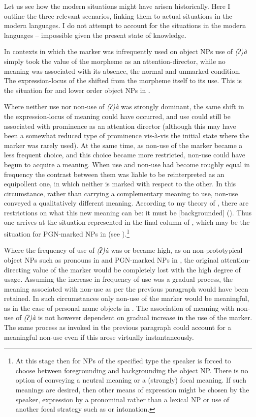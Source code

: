 \documentclass[output=paper]{LSP/langsci}
\begin{document}
Let us see how the modern situations might have arisen historically. 
Here I outline the three relevant scenarios, linking them to actual situations in the modern languages. I do not attempt to account for the situations in the modern languages – impossible given the present state of knowledge.

In contexts in which the marker was infrequently used on object NPs use of \textit{(ʔ)à} simply took the value of the morpheme as an attention-director, while no meaning was associated with its absence, the normal and unmarked condition. 
The expression-locus of the  shifted from the morpheme itself to its use. This is the situation for  and lower order  object NPs in .

Where neither use nor non-use of \textit{(ʔ)à} was strongly dominant, the same shift in the expression-locus of meaning could have occurred, and use could still be associated with prominence as an attention director (although this may have been a somewhat reduced type of prominence vis-à-vis the initial state where the marker was rarely used). At the same time, as non-use of the marker became a less frequent choice, and this choice became more restricted, non-use could have begun to acquire a meaning. When use and non-use had become roughly equal in frequency the contrast between them was liable to be reinterpreted as an equipollent one, in which neither is marked with respect to the other. In this circumstance, rather than carrying a complementary meaning to use, non-use conveyed a qualitatively different meaning. According to my theory of , there are restrictions on what this new meaning can be: it must be [backgrounded] (\citealt{McGregor2013Optionality}). Thus one arrives at the situation represented in the final column of , which may be the situation for PGN-marked NPs in  (see ).\footnote{At this stage then for NPs of the specified type the speaker is forced to choose between foregrounding and backgrounding the object NP. There is no option of conveying a neutral meaning or a (strongly) focal meaning. If such meanings are desired, then other means of expression might be chosen by the speaker, \eg expression by a pronominal rather than a lexical NP or use of another focal strategy such as  or intonation.}

Where the frequency of use of \textit{(ʔ)à} was or became high, as on non-prototypical object NPs such as pronouns in  and PGN-marked  NPs in , the original attention-directing value of the marker would be completely lost with the high degree of usage. Assuming the increase in frequency of use was a gradual process, the meaning associated with non-use as per the previous paragraph would have been retained. In such circumstances only non-use of the marker would be meaningful, as in the case of personal name objects in . The association of meaning with non-use of \textit{(ʔ)à} is not however dependent on gradual increase in the use of the marker. The same process as invoked in the previous paragraph could account for a meaningful non-use even if this arose virtually instantaneously.
\end{document}
